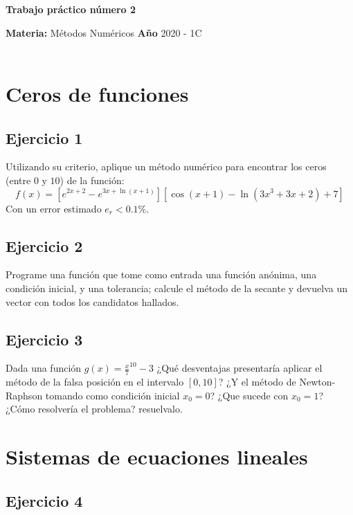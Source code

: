 \documentclass[a4paper, 11pt]{article}
\begin{document}
\renewcommand{\listtablename}{Índice de tablas} 
\renewcommand{\tablename}{Tabla}
\begin{center}
\LARGE \bf Trabajo práctico número 2
\end{center}

\vspace{1cm} 
\noindent\textbf{Materia:} M\'etodos Num\'ericos \hfill
\textbf{Año} 2020 - 1C \\
\hfill \\
\section*{Ceros de funciones}

\subsection*{Ejercicio 1}
Utilizando su criterio, aplique un método numérico para encontrar los ceros (entre $0$ y $10$) de la función:
$$f(x) = \left[ e^{2x+2} - e^{3x+\ln(x+1)}\right]\left[ \cos(x+1) - \ln(3x^3 +3x+2)+ 7\right] $$
Con un error estimado $e_r <0.1\%$.

\subsection*{Ejercicio 2}
Programe una función que tome como entrada una función anónima, una condición inicial, y una tolerancia; calcule el método de la secante y devuelva un vector con todos los candidatos hallados. 

\subsection*{Ejercicio 3}
Dada una función $g(x) = \frac{x}{7}^{10} -3$ ¿Qué desventajas presentaría aplicar el método de la falsa posición en el intervalo $[0,10]$? ¿Y el método de Newton-Raphson tomando como condición inicial $x_0 = 0$? ¿Que sucede con $x_0 =1$? ¿Cómo resolvería el problema? resuelvalo.

\section*{Sistemas de ecuaciones lineales}

\subsection*{Ejercicio 4}
\end{document}

